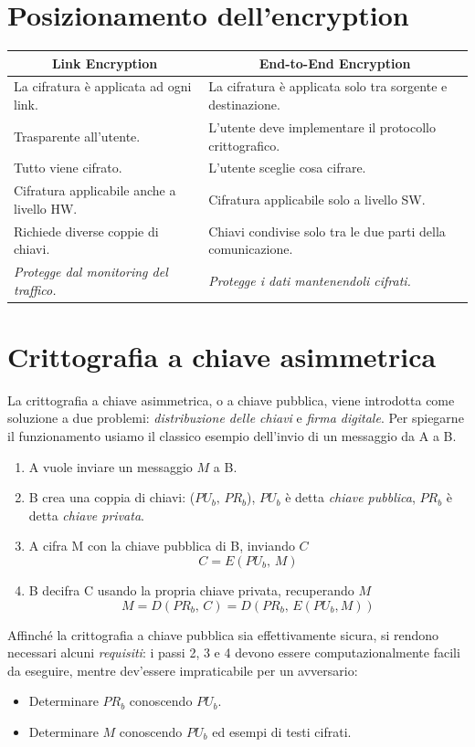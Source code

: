 \documentclass[a4paper, 11pt, notitlepage, fleqn]{report}
\begin{document}
\section{Posizionamento dell'encryption}
\begin{table}[htp]
\renewcommand{\arraystretch}{1.3}
\begin{tabularx}{\linewidth}{X|X}
	\multicolumn{1}{c}{Link Encryption} & \multicolumn{1}{c}{End-to-End Encryption}\\
	\toprule
	La cifratura è applicata ad ogni link. & La cifratura è applicata solo tra sorgente e destinazione.\\
	Trasparente all'utente. & L'utente deve implementare il protocollo crittografico.\\
	Tutto viene cifrato. & L'utente sceglie cosa cifrare.\\
	Cifratura applicabile anche a livello HW. & Cifratura applicabile solo a livello SW.\\
	Richiede diverse coppie di chiavi. & Chiavi condivise solo tra le due parti della comunicazione.\\
	\emph{Protegge dal monitoring del traffico.} & \emph{Protegge i dati mantenendoli cifrati.}
\end{tabularx}
\end{table}

\section{Crittografia a chiave asimmetrica}
La crittografia a chiave asimmetrica, o a chiave pubblica, viene introdotta come soluzione a due problemi: \emph{distribuzione delle chiavi} e \emph{firma digitale}. Per spiegarne il funzionamento usiamo il classico esempio dell'invio di un messaggio da A a B. 
\begin{enumerate}
	\item A vuole inviare un messaggio $M$ a B.
	\item B crea una coppia di chiavi: ($PU_b,\,PR_b$), $PU_b$ è detta \emph{chiave pubblica}, $PR_b$ è detta \emph{chiave privata}.
	\item A cifra M con la chiave pubblica di B, inviando $C$
	\begin{equation*}
		C=E(PU_b,\,M)
	\end{equation*}
	\item B decifra C usando la propria chiave privata, recuperando $M$
	\begin{equation*}
		M = D(PR_b,\,C) = D(PR_b,\,E(PU_b, M))
	\end{equation*}
\end{enumerate}
\noindent Affinché la crittografia a chiave pubblica sia effettivamente sicura, si rendono necessari alcuni \emph{requisiti}: i passi 2, 3 e 4 devono essere computazionalmente facili da eseguire, mentre dev'essere impraticabile per un avversario:
\begin{itemize}
	\item Determinare $PR_b$ conoscendo $PU_b$.
	\item Determinare $M$ conoscendo $PU_b$ ed esempi di testi cifrati.
\end{itemize}
\end{document}
